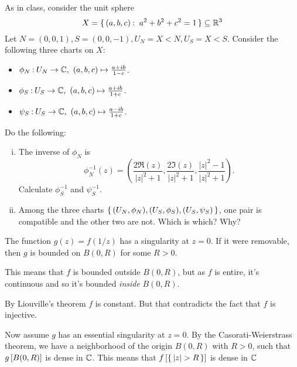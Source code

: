 \documentclass[12pt]{memoir}
\begin{document}
\begin{Ej}
    As in class, consider the unit sphere
    $$X=\set{(a,b,c)\:\ a^2+b^2+c^2=1}\subseteq\bR^3$$
    Let $N = (0, 0, 1), S = (0, 0, -1), U_N = X\less N, U_S = X\less S$. Consider the following three
    charts on $X$:
    \begin{itemize}
        \item $\phi_N\: U_N\to\bC,\ (a,b,c)\mapsto\frac{a+ib}{1-c}$.
        \item $\phi_S\: U_S\to\bC,\ (a,b,c)\mapsto\frac{a+ib}{1+c}$.
        \item $\psi_S\: U_S\to\bC,\ (a,b,c)\mapsto\frac{a-ib}{1+c}$.
    \end{itemize}
    Do the following:
    \begin{enumerate}[i)]
        \itemsep=-0.4em
        \item The inverse of $\phi_N$ is 
        $$\phi_N^{-1}(z)=\left(\frac
        {2\Re(z)}{|z|^2+1},\frac
        {2\Im(z)}{|z|^2+1},\frac
        {|z|^2-1}{|z|^2+1}\right).$$
        Calculate $\phi_S^{-1}$ and $\psi_S^{-1}$.
        \item Among the three charts $\{\,(U_N,\phi_N),(U_S,\phi_S),(U_S,\psi_S)\,\}$, one pair is compatible and the other two are not. Which is which? Why?\par 
    \end{enumerate}
\end{Ej}

\begin{ptcbr}
The function $g(z)=f(1/z)$ has a singularity at $z=0$. If it were removable, then $g$ is bounded on $B(0,R)$ for some $R>0$.\par 
This means that $f$ is bounded outside $B(0,R)$, but as $f$ is entire, it's continuous and so it's bounded \emph{inside} $B(0,R)$.\par 
By Liouville's theorem $f$ is constant. But that contradicts the fact that $f$ is injective.\par 
Now assume $g$ has an essential singularity at $z=0$. By the Casorati-Weierstrass theorem, we have a neighborhood of the origin $B(0,R)$ with $R>0$, such that $g\left\lbrack B(0,R)\right\rbrack$ is dense in $\mathbb{C}$. This means that $f\bonj{\set{|z|>R}}$ is dense in $\mathbb{C}$
\end{ptcbr}
\end{document}
